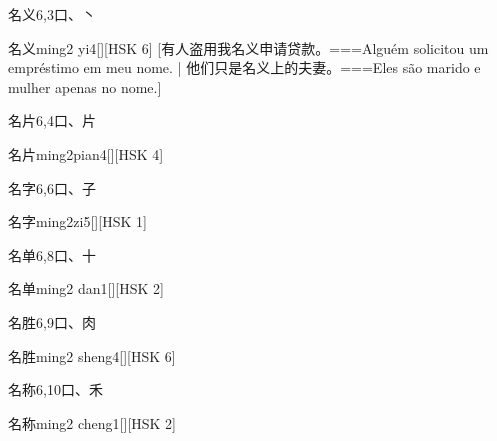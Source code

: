 \begin{Entry}{名义}{6,3}{⼝、⼂}
  \begin{Phonetics}{名义}{ming2 yi4}[][HSK 6]
    [有人盗用我名义申请贷款。===Alguém solicitou um empréstimo em meu nome. | 他们只是名义上的夫妻。===Eles são marido e mulher apenas no nome.]
  \end{Phonetics}
\end{Entry}

\begin{Entry}{名片}{6,4}{⼝、⽚}
  \begin{Phonetics}{名片}{ming2pian4}[][HSK 4]
  \end{Phonetics}
\end{Entry}

\begin{Entry}{名字}{6,6}{⼝、⼦}
  \begin{Phonetics}{名字}{ming2zi5}[][HSK 1]
  \end{Phonetics}
\end{Entry}

\begin{Entry}{名单}{6,8}{⼝、⼗}
  \begin{Phonetics}{名单}{ming2 dan1}[][HSK 2]
  \end{Phonetics}
\end{Entry}

\begin{Entry}{名胜}{6,9}{⼝、⾁}
  \begin{Phonetics}{名胜}{ming2 sheng4}[][HSK 6]
  \end{Phonetics}
\end{Entry}

\begin{Entry}{名称}{6,10}{⼝、⽲}
  \begin{Phonetics}{名称}{ming2 cheng1}[][HSK 2]
  \end{Phonetics}
\end{Entry}

